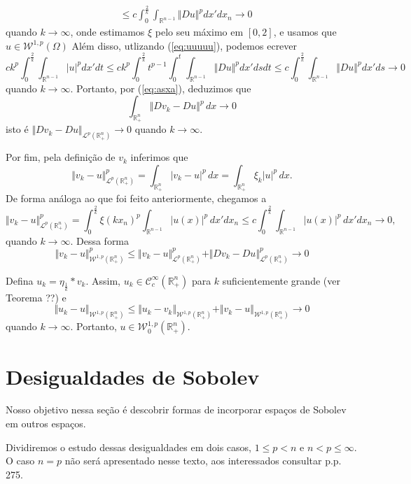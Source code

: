 \documentclass[a4paper, 11pt]{book}
\theoremstyle{definition}
\newcommand{\bR}{\mathbb{R}}
\newcommand{\cC}{\mathcal{C}}
\newcommand{\cL}{\mathcal{L}}
\newcommand{\cW}{\mathcal{W}}
\begin{document}
\begin{prf}
\[\begin{aligned}
            &\leqslant c \int_{0}^{\frac{2}{k}} \int_{\bR^{n-1}} \Vert Du \Vert^p dx' dx_n \longrightarrow 0
        \end{aligned}
    \]
    quando $k \to \infty$, onde estimamos $\xi$ pelo seu máximo em $[0,2]$, e usamos que $u \in \cW^{1,p}(\Omega)$ 
    Além disso, utlizando (\ref{eq:uuuuu}), podemos ecrever
    \[
        ck^p \int_{0}^{\frac{2}{k}} \int_{\bR^{n-1}} |u|^p dx'dt \leqslant ck^p \int_{0}^{\frac{2}{k}} t^{p-1} \int_{0}^{t} \int_{\bR^{n-1}} \Vert Du \Vert^p dx'ds dt \leqslant c \int_0^{\frac{2}{k}} \int_{\bR^{n-1}} \Vert Du \Vert^p dx'ds \to 0
    \]
    quando $k \to \infty$.
    Portanto, por (\ref{eq:asxa}), deduzimos que
    \[
        \int_{\bR^n_+} \Vert Dv_k - Du \Vert^p \,dx \to 0
    \]
    isto é $\Vert Dv_k - Du \Vert_{\cL^p(\bR^n_+)} \to 0$ quando $k \to \infty$.

    Por fim, pela definição de $v_k$ inferimos que
    \[
        \Vert v_k - u \Vert_{\cL^p(\bR^n_+)}^p = \int_{\bR^n_+} |v_k - u|^p \,dx = \int_{\bR^n_+} \xi_k|u|^p \,dx.
    \]
    De forma análoga ao que foi feito anteriormente, chegamos a
    \[
        \Vert v_k - u \Vert_{\cL^p(\bR^n_+)}^p = \int_{0}^{\frac{2}{k}} \xi(kx_n)^p \int_{\bR^{n-1}} |u(x)|^p \,dx'dx_n \leqslant c \int_{0}^{\frac{2}{k}} \int_{\bR^{n-1}} |u(x)|^p \, dx'dx_n \to 0,
    \]
    quando $k \to \infty$. Dessa forma
    \[
        \Vert v_k - u \Vert_{\cW^{1,p}(\bR^n_+)}^p \leqslant \Vert v_k - u \Vert_{\cL^{p}(\bR^n_+)}^p + \Vert Dv_k - Du \Vert_{\cL^{p}(\bR^n_+)}^p \to 0
    \]

    Defina $u_k = \eta_{\frac{1}{k}} * v_k$. Assim, $u_k \in \cC^{\infty}_c(\bR^n_+)$ para $k$ suficientemente grande (ver Teorema ??) e 
    \[
        \Vert u_k - u \Vert_{\cW^{1,p}(\bR^n_+)} \leqslant \Vert u_k - v_k \Vert_{\cW^{1,p}(\bR^n_+)} + \Vert v_k - u \Vert_{\cW^{1,p}(\bR^n_+)} \to 0
    \]
    quando $k \to \infty$.
    Portanto, $u \in \cW^{1,p}_0(\bR^n_+)$.
\end{prf}

\section{Desigualdades de Sobolev}

Nosso objetivo nessa seção é descobrir formas de incorporar espaços de Sobolev em outros espaços.

Dividiremos o estudo dessas desigualdades em dois casos, $1 \leqslant p < n$ e $n < p \leqslant \infty$.
O caso $n = p$ não será apresentado nesse texto, aos interessados consultar \cite{evans-pde} p.p. 275.
\end{document}
